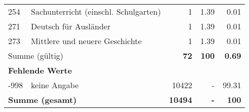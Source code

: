 \begin{longtable}{lXrrr}
        254 & \multicolumn{1}{X}{Sachunterricht (einschl. Schulgarten)} & %
          \num{1} &
          \num[round-mode=places,round-precision=2]{1.39} &
          \num[round-mode=places,round-precision=2]{0.01} \\

        271 & \multicolumn{1}{X}{Deutsch für Ausländer} & %
          \num{1} &
          \num[round-mode=places,round-precision=2]{1.39} &
          \num[round-mode=places,round-precision=2]{0.01} \\

        273 & \multicolumn{1}{X}{Mittlere und neuere Geschichte} & %
          \num{1} &
          \num[round-mode=places,round-precision=2]{1.39} &
          \num[round-mode=places,round-precision=2]{0.01} \\

     \midrule
     \multicolumn{2}{l}{Summe (gültig)} &
       \textbf{\num{72}} &
     \textbf{\num{100}} &
       \textbf{\num[round-mode=places,round-precision=2]{0.69}} \\
     \multicolumn{5}{l}{\textbf{Fehlende Werte}}\\
       -998 &
       keine Angabe &
         \num{10422} &
        - &
         \num[round-mode=places,round-precision=2]{99.31} \\
     \midrule
     \multicolumn{2}{l}{\textbf{Summe (gesamt)}} &
          \textbf{\num{10494}} &
        \textbf{-} &
        \textbf{\num{100}} \\
     \bottomrule
     \end{longtable}
     
